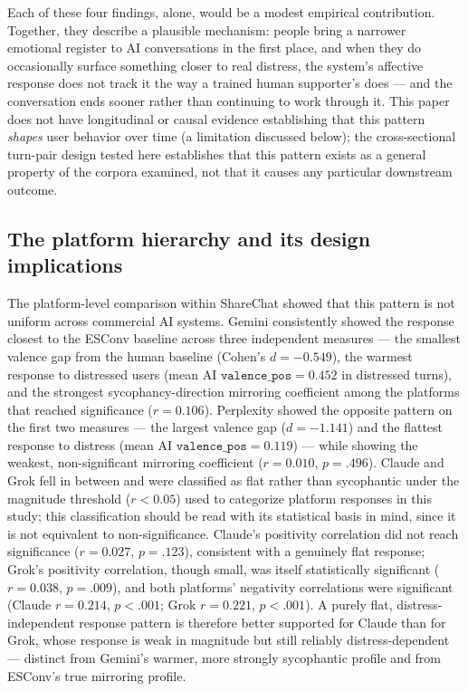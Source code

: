 \documentclass[11pt]{article}
\begin{document}
Each of these four findings, alone, would be a modest empirical contribution. Together, they describe a plausible mechanism: people bring a narrower emotional register to AI conversations in the first place, and when they do occasionally surface something closer to real distress, the system's affective response does not track it the way a trained human supporter's does --- and the conversation ends sooner rather than continuing to work through it. This paper does not have longitudinal or causal evidence establishing that this pattern \emph{shapes} user behavior over time (a limitation discussed below); the cross-sectional turn-pair design tested here establishes that this pattern exists as a general property of the corpora examined, not that it causes any particular downstream outcome.

\subsection{The platform hierarchy and its design implications}

The platform-level comparison within ShareChat showed that this pattern is not uniform across commercial AI systems. Gemini consistently showed the response closest to the ESConv baseline across three independent measures --- the smallest valence gap from the human baseline (Cohen's $d = -0.549$), the warmest response to distressed users (mean AI $\texttt{valence\_pos} = 0.452$ in distressed turns), and the strongest sycophancy-direction mirroring coefficient among the platforms that reached significance ($r = 0.106$). Perplexity showed the opposite pattern on the first two measures --- the largest valence gap ($d = -1.141$) and the flattest response to distress (mean AI $\texttt{valence\_pos} = 0.119$) --- while showing the weakest, non-significant mirroring coefficient ($r = 0.010$, $p = .496$). Claude and Grok fell in between and were classified as flat rather than sycophantic under the magnitude threshold ($r < 0.05$) used to categorize platform responses in this study; this classification should be read with its statistical basis in mind, since it is not equivalent to non-significance. Claude's positivity correlation did not reach significance ($r = 0.027$, $p = .123$), consistent with a genuinely flat response; Grok's positivity correlation, though small, was itself statistically significant ($r = 0.038$, $p = .009$), and both platforms' negativity correlations were significant (Claude $r = 0.214$, $p < .001$; Grok $r = 0.221$, $p < .001$). A purely flat, distress-independent response pattern is therefore better supported for Claude than for Grok, whose response is weak in magnitude but still reliably distress-dependent --- distinct from Gemini's warmer, more strongly sycophantic profile and from ESConv's true mirroring profile.
\end{document}

